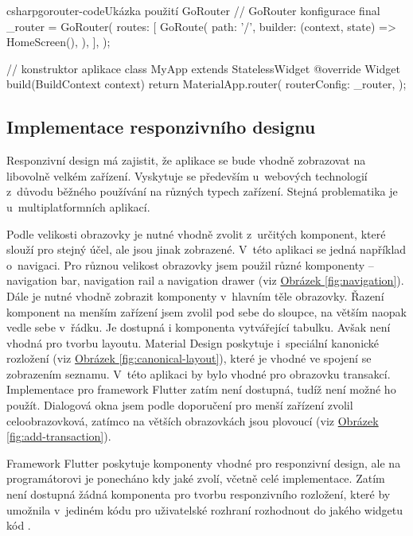 \documentclass[
  biblatex,
  figures=true,
  tables=false,
  glossaries,
  index
]{kidiplom}
\begin{document}
\begin{kicode}{csharp}{gorouter-code}{Ukázka použití GoRouter}
  // GoRouter konfigurace
  final _router = GoRouter(
    routes: [
      GoRoute(
        path: '/',
        builder: (context, state) => HomeScreen(),
      ),
    ],
  );

  // konstruktor aplikace
  class MyApp extends StatelessWidget {
    @override
    Widget build(BuildContext context) {
      return MaterialApp.router(
        routerConfig: _router,
      );
    }
  }
\end{kicode}

\subsection{Implementace responzivního designu}
Responzivní design má zajistit, že aplikace se bude vhodně zobrazovat na libovolně velkém zařízení. Vyskytuje se především u~webových technologií z~důvodu běžného používání na různých typech zařízení. Stejná problematika je u~multiplatformních aplikací.

Podle velikosti obrazovky je nutné vhodně zvolit z~určitých komponent, které slouží pro stejný účel, ale jsou jinak zobrazené. V~této aplikaci se jedná například o~navigaci. Pro různou velikost obrazovky jsem použil různé komponenty -- navigation bar, navigation rail a navigation drawer (viz \hyperref[fig:navigation]{Obrázek \ref{fig:navigation}}). Dále je nutné vhodně zobrazit komponenty v~hlavním těle obrazovky. Řazení komponent na menším zařízení jsem zvolil pod sebe do sloupce, na větším naopak vedle sebe v~řádku. Je dostupná i komponenta  vytvářející tabulku. Avšak není vhodná pro tvorbu layoutu. Material Design poskytuje i~speciální kanonické rozložení (viz \hyperref[fig:canonical-layout]{Obrázek \ref{fig:canonical-layout}}), které je vhodné ve spojení se zobrazením seznamu. V~této aplikaci by bylo vhodné pro obrazovku transakcí. Implementace pro framework Flutter zatím není dostupná, tudíž není možné ho použít. Dialogová okna jsem podle doporučení pro menší zařízení zvolil celoobrazovková, zatímco na větších obrazovkách jsou plovoucí (viz \hyperref[fig:add-transaction]{Obrázek \ref{fig:add-transaction}}).

Framework Flutter poskytuje komponenty vhodné pro responzivní design, ale na programátorovi je ponecháno kdy jaké zvolí, včetně celé implementace. Zatím není dostupná žádná komponenta pro tvorbu responzivního rozložení, které by umožnila v~jediném kódu pro uživatelské rozhraní rozhodnout do jakého widgetu kód .
\end{document}
